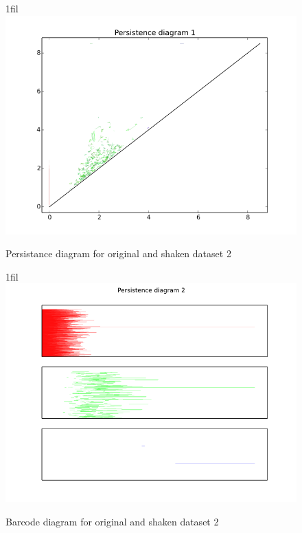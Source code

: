 \documentclass[11pt]{article}
\makeatletter
\newcommand*{\centerfloat}{
  \parindent \z@
  \leftskip \z@ \@plus 1fil \@minus \textwidth
  \rightskip\leftskip
  \parfillskip \z@skip}
\makeatother
\begin{document}
\begin{figure}[H]
   \centerfloat
   \includegraphics[width=1.2\textwidth]{data2_d7_5_pers.png}
   \caption{Persistance diagram for original and shaken dataset 2}
   \label{data2_pers}
\end{figure}

\begin{figure}[H]
   \centerfloat
   \includegraphics[width=1.2\textwidth]{data2_d7_5_bar.png}
   \caption{Barcode diagram for original and shaken dataset 2}
   \label{data2_bar}
\end{figure}
\end{document}
